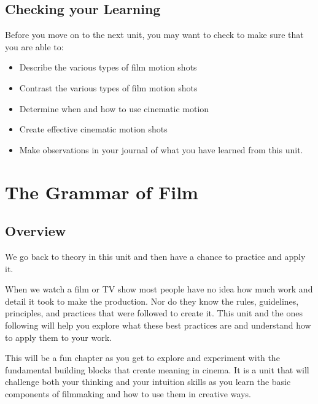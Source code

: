 \documentclass[
]{book}
\providecommand{\tightlist}{%
  \setlength{\itemsep}{0pt}\setlength{\parskip}{0pt}}
\begin{document}
\hypertarget{checking-your-learning-3}{%
\section*{Checking your Learning}\label{checking-your-learning-3}}

\begin{progress}
Before you move on to the next unit, you may want to check to make sure that you are able to:

\begin{itemize}
\tightlist
\item
  Describe the various types of film motion shots
\item
  Contrast the various types of film motion shots
\item
  Determine when and how to use cinematic motion
\item
  Create effective cinematic motion shots
\item
  Make observations in your journal of what you have learned from this unit.
\end{itemize}
\end{progress}

\hypertarget{the-grammar-of-film}{%
\chapter{The Grammar of Film}\label{the-grammar-of-film}}

\hypertarget{overview-4}{%
\section*{Overview}\label{overview-4}}

We go back to theory in this unit and then have a chance to practice and apply it.

When we watch a film or TV show most people have no idea how much work and detail it took to make the production. Nor do they know the rules, guidelines, principles, and practices that were followed to create it. This unit and the ones following will help you explore what these best practices are and understand how to apply them to your work.

This will be a fun chapter as you get to explore and experiment with the fundamental building blocks that create meaning in cinema. It is a unit that will challenge both your thinking and your intuition skills as you learn the basic components of filmmaking and how to use them in creative ways.
\end{document}
